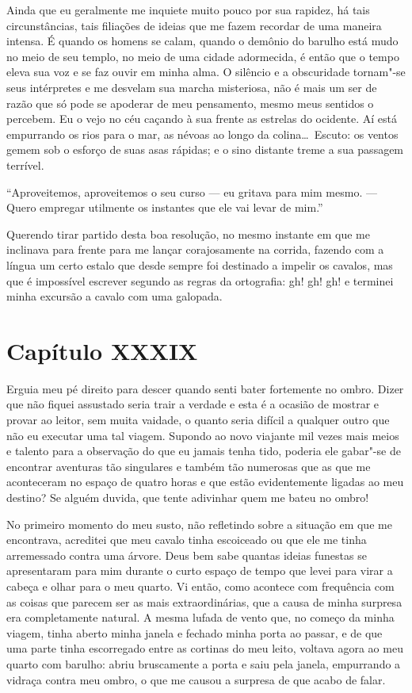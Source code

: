  Ainda que eu geralmente me inquiete muito pouco por sua rapidez, há
tais circunstâncias, tais filiações de ideias que me fazem recordar de
uma maneira intensa. É quando os homens se calam, quando o demônio do
barulho está mudo no meio de seu templo, no meio de uma cidade
adormecida, é então que o tempo eleva sua voz e se faz ouvir em minha
alma. O silêncio e a obscuridade tornam"-se seus intérpretes e me
desvelam sua marcha misteriosa, não é mais um ser de razão que só pode
se apoderar de meu pensamento, mesmo meus sentidos o percebem. Eu o
vejo no céu caçando à sua frente as estrelas do ocidente. Aí está
empurrando os rios para o mar, as névoas ao longo da colina\ldots\ Escuto:
os ventos gemem sob o esforço de suas asas rápidas; e o sino distante
treme a sua passagem terrível.

 ``Aproveitemos, aproveitemos o seu curso --- eu gritava para mim mesmo. ---
Quero empregar utilmente os instantes que ele vai levar de mim.''

 Querendo tirar partido desta boa resolução, no mesmo instante em que me
inclinava para frente para me lançar corajosamente na corrida, fazendo
com a língua um certo estalo que desde sempre foi destinado a impelir
os cavalos, mas que é impossível escrever segundo as regras da
ortografia: gh!     gh!     gh!
e terminei minha excursão a cavalo com uma galopada.

\section*{Capítulo XXXIX}

 Erguia meu pé direito para descer quando senti bater fortemente no
ombro. Dizer que não fiquei assustado seria trair a verdade e esta é a
ocasião de mostrar e provar ao leitor, sem muita vaidade, o quanto
seria difícil a qualquer outro que não eu executar uma tal viagem.
Supondo ao novo viajante mil vezes mais meios e talento para a
observação do que eu jamais tenha tido, poderia ele gabar"-se de encontrar
aventuras tão singulares e também tão numerosas que as que me
aconteceram no espaço de quatro horas e que estão evidentemente ligadas
ao meu destino? Se alguém duvida, que tente adivinhar quem me bateu no
ombro!

 No primeiro momento do meu susto, não refletindo sobre a situação em
que me encontrava, acreditei que meu cavalo tinha escoiceado ou que ele
me tinha arremessado contra uma árvore. Deus bem sabe quantas ideias
funestas se apresentaram para mim durante o curto espaço de tempo que
levei para virar a cabeça e olhar para o meu quarto. Vi então, como
acontece com frequência com as coisas que parecem ser as mais
extraordinárias, que a causa de minha surpresa era completamente
natural. A mesma lufada de vento que, no começo da minha viagem, tinha
aberto minha janela e fechado minha porta ao passar, e de que uma parte
tinha escorregado entre as cortinas do meu leito, voltava agora ao meu
quarto com barulho: abriu bruscamente a porta e saiu pela janela,
empurrando a vidraça contra meu ombro, o que me causou a surpresa de
que acabo de falar.

